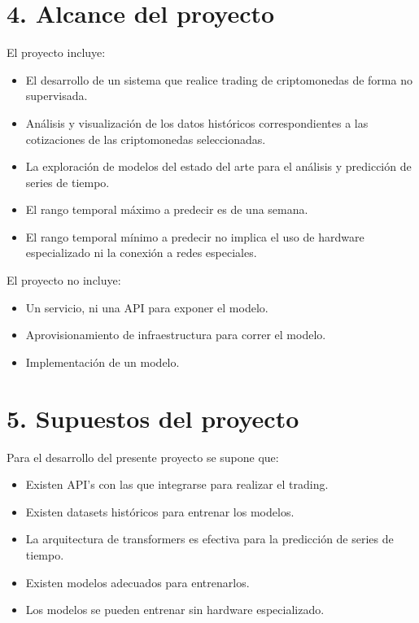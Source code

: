 \documentclass[
    11pt, %
]{charter}
\begin{document}
    \section{4. Alcance del proyecto}
    \label{sec:alcance}
    El proyecto incluye:
    \begin{itemize}
        \item El desarrollo de un sistema que realice trading de criptomonedas de forma no supervisada.
        \item Análisis y visualización de los datos históricos correspondientes a las cotizaciones de las criptomonedas seleccionadas.
        \item La exploración de modelos del estado del arte para el análisis y predicción de series de tiempo.
        \item El rango temporal máximo a predecir es de una semana.
        \item El rango temporal mínimo a predecir no implica el uso de hardware especializado ni la conexión a redes especiales.
    \end{itemize}
    El proyecto no incluye:
    \begin{itemize}
        \item Un servicio, ni una API para exponer el modelo.
        \item Aprovisionamiento de infraestructura para correr el modelo.
        \item Implementación de un modelo.
    \end{itemize}


    \section{5. Supuestos del proyecto}
    \label{sec:supuestos}
    Para el desarrollo del presente proyecto se supone que:

    \begin{itemize}
        \item Existen API's con las que integrarse para realizar el trading.
        \item Existen datasets históricos para entrenar los modelos.
        \item La arquitectura de transformers es efectiva para la predicción de series de tiempo.
        \item Existen modelos adecuados para entrenarlos.
        \item Los modelos se pueden entrenar sin hardware especializado.
    \end{itemize}
\end{document}
